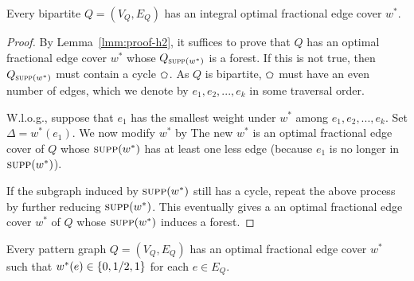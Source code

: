 \begin{lemma} \label{lmm:proof-h3}
   Every bipartite $Q = (V_Q, E_Q)$ has an integral optimal fractional edge cover $w^*$.
\end{lemma}

\begin{proof}
    By Lemma~\ref{lmm:proof-h2}, it suffices to prove that $Q$ has an optimal fractional edge cover $w^*$ whose $Q_{\textsc{supp}(w^*)}$ is a forest. If this is not true, then $Q_{\textsc{supp}(w^*)}$ must contain a cycle $\mycycle$. As $Q$ is bipartite, $\mycycle$ must have an even number of edges, which we denote by $e_1, e_2, ..., e_k$ in some traversal order.

    \vgap

    W.l.o.g., suppose that $e_1$ has the smallest weight under $w^*$ among $e_1, e_2, ..., e_k$. Set $\Delta = w^*(e_1)$. We now modify $w^*$ by
    The new $w^*$ is an optimal fractional edge cover of $Q$ whose $\textsc{supp}(w^*)$ has at least one less edge (because $e_1$ is no longer in $\textsc{supp}(w^*)$).

    \vgap

    If the subgraph induced by $\textsc{supp}(w^*)$ still has a cycle, repeat the above process by further reducing $\textsc{supp}(w^*)$. This eventually gives a an optimal fractional edge cover $w^*$ of $Q$ whose $\textsc{supp}(w^*)$ induces a forest.
\end{proof}

\begin{lemma} \label{lmm:proof-h4}
   Every pattern graph $Q = (V_Q, E_Q)$ has an optimal fractional edge cover $w^*$ such that $w^*(e) \in \{0, 1/2, 1\}$ for each $e \in E_Q$.
\end{lemma}

